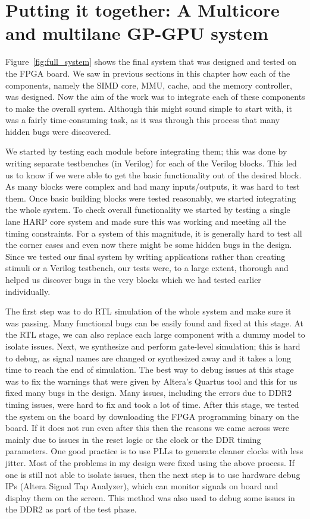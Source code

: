 \section{Putting it together: A Multicore and multilane GP-GPU system}
Figure~\ref{fig:full_system} shows the final system that was designed and tested on the FPGA board. We saw in previous sections in this chapter how each of the components, namely the SIMD core, MMU, cache, and the memory controller, was designed. Now the aim of the work was to integrate each of these components to make the overall system. Although this might sound simple to start with, it was a fairly time-consuming task, as it was through this process that many hidden bugs were discovered. 

We started by testing each module before integrating them; this was done by writing separate testbenches (in Verilog) for each of the Verilog blocks. This led us to know if we were able to get the basic functionality out of the desired block. As many blocks were complex and had many inputs/outputs, it was hard to test them. Once basic building blocks were tested reasonably, we started integrating the whole system. To check overall functionality we started by testing a single lane HARP core system and made sure this was working and meeting all the timing constraints. For a system of this magnitude, it is generally hard to test all the corner cases and even now there might be some hidden bugs in the design. Since we tested our final system by writing applications rather than creating stimuli or a Verilog testbench, our tests were, to a large extent, thorough and helped us discover bugs in the very blocks which we had tested earlier individually.

The first step was to do RTL simulation of the whole system and make sure it was passing. Many functional bugs can be easily found and fixed at this stage. At the RTL stage, we can also replace each large component with a dummy model to isolate issues. Next, we synthesize and perform gate-level simulation; this is hard to debug, as signal names are changed or synthesized away and it takes a long time to reach the end of simulation. The best way to debug issues at this stage was to fix the warnings that were given by Altera's Quartus tool and this for us fixed many bugs in the design. Many issues, including the errors due to DDR2 timing issues, were hard to fix and took a lot of time. After this stage, we tested the system on the board by downloading the FPGA programming binary on the board. If it does not run even after this then the reasons we came across were mainly due to issues in the reset logic or the clock or the DDR timing parameters. One good practice is to use PLLs to generate cleaner clocks with less jitter. Most of the problems in my design were fixed using the above process. If one is still not able to isolate issues, then the next step is to use hardware debug IPs (Altera Signal Tap Analyzer), which can monitor signals on board and display them on the screen. This method was also used to debug some issues in the DDR2 as part of the test phase.

